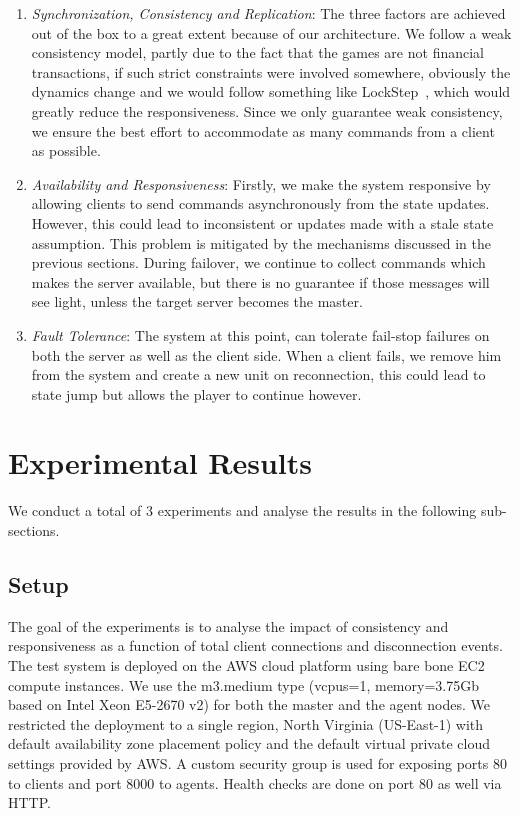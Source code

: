 \documentclass[a4paper]{IEEEtran}
\begin{document}
  \begin{enumerate}
    \item \emph{Synchronization, Consistency and Replication}: The three factors are achieved out of the box to a great extent because of our architecture. We follow a weak consistency model, partly due to the fact that the games are not financial transactions, if such strict constraints were involved somewhere, obviously the dynamics change and we would follow something like LockStep~\cite{lockstep}, which would greatly reduce the responsiveness. Since we only guarantee weak consistency, we ensure the best effort to accommodate as many commands from a client as possible.

    \item \emph{Availability and Responsiveness}: Firstly, we make the system responsive by allowing clients to send commands asynchronously from the state updates. However, this could lead to inconsistent or updates made with a stale state assumption. This problem is mitigated by the mechanisms discussed in the previous sections. During failover, we continue to collect commands which makes the server available, but there is no  guarantee if those messages will see light, unless the target server becomes the master.
  
    \item \emph{Fault Tolerance}: The system at this point, can tolerate fail-stop failures on both the server as well as the client side. When a client fails, we remove him from the system and create a new unit on reconnection, this could lead to state jump but allows the player to continue however.

  \end{enumerate}
  
  \section{Experimental Results} \label{experiments}
  
  We conduct a total of 3 experiments and analyse the results in the following sub-sections.
  
  \subsection{Setup}
  
  The goal of the experiments is to analyse the impact of consistency and responsiveness as a function of total client connections and disconnection events. The test system is deployed on the AWS cloud platform using bare bone EC2 compute instances. We use the m3.medium type (vcpus=1, memory=3.75Gb based on Intel Xeon E5-2670 v2) for both the master and the agent nodes. We restricted the deployment to a single region, North Virginia (US-East-1) with default availability zone placement policy and the default virtual private cloud settings provided by AWS. A custom security group is used for exposing ports 80 to clients and port 8000 to agents. Health checks are done on port 80 as well via HTTP.
  
\end{document}
